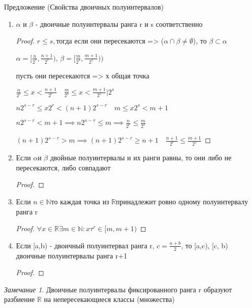 \documentclass[a4paper]{article}
\theoremstyle{definition}
\theoremstyle{remark}
\newtheorem*{remark}{Замечание}
\begin{document}
     Предложение (Свойства двоичных полуинтервалов)
     \begin{enumerate}
          \item $\alpha$ и $\beta$ - двоичные полуинтервалы ранга r и s соответственно
          \begin{proof}
               $r\leq s, $тогда если они пересекаются => ($\alpha \cap \beta\neq\emptyset$), то $\beta \subset \alpha$

          $\alpha = [\frac{n}{2^r}, \frac{n+1}{2^r})$, $\beta = [\frac{m}{2^s}, \frac{m+1}{2^s}))$

          пусть они пересекаются => х общая точка

          $\frac{n}{2^r}\leq x < \frac{n+1}{2^r}\quad \frac{m}{2^s}\leq x < \frac{m+1}{2^s} | 2^s$

          $n2^{s-r}\leq x 2^r < (n+1)2^{s-r}\quad m \leq x 2^s < m+1$

          $n 2^{s-r}< m+1 \implies n 2^{s-r}\leq m\implies \frac{n}{2^r}\leq \frac{m}{2^s}$

          $(n+1)2^{s-r}> m\implies (n+1)2^{s-r}\geq n+1\quad \frac{n+1}{2^r}\leq \frac{m+1}{2^s}$

          \end{proof}
          \item Если $\alpha$и $\beta$ двойные полуинтервалы и их ранги равны, то они либо не пересекаются, либо совпадают
          \begin{proof}
               
          \end{proof} 
          \item Если $n\in \mathbb{N} $то каждая точка из $\mathbb{R} $принадлежит ровно одному полуинтервалу ранга r
          
          \begin{proof}
               $\forall x\in\mathbb{R} \exists m \in \mathbb{N} : x\tau^r\in[m, m+1)$
          \end{proof}
          \item Если [a,b) - двоичный полуинтервал ранга r, $c = \frac{a+b}{2}$, то [a,c), [c, b) двоичные полуинтервалы ранга r+1
          \begin{proof}
               
          \end{proof}
     \end{enumerate}
     \begin{remark}
          Двоичные полуинтервалы фиксированного ранга r образуют разбиение $\mathbb{R} $ на непересекающиеся классы (множества)

     \end{remark}
\end{document}
